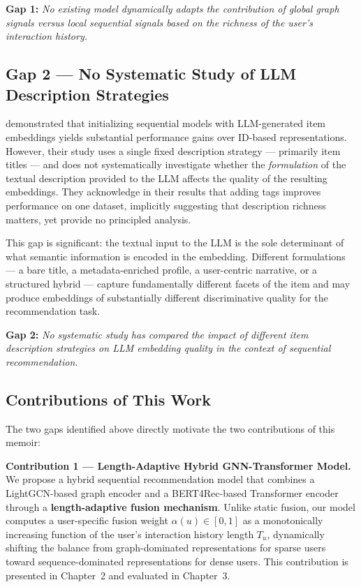 \documentclass[12pt,a4paper]{report}
\newcommand{\textcite}[1]{\citet{#1}}
\begin{document}
\noindent\textbf{Gap 1:} \textit{No existing model dynamically
adapts the contribution of global graph signals versus local
sequential signals based on the richness of the user's
interaction history.}

\subsection{Gap 2 — No Systematic Study of LLM Description Strategies}

\textcite{boz2025improving} demonstrated that initializing
sequential models with LLM-generated item embeddings yields
substantial performance gains over ID-based representations.
However, their study uses a single fixed description strategy
--- primarily item titles --- and does not systematically
investigate whether the \textit{formulation} of the textual
description provided to the LLM affects the quality of the
resulting embeddings. They acknowledge in their results that
adding tags improves performance on one dataset, implicitly
suggesting that description richness matters, yet provide
no principled analysis.

This gap is significant: the textual input to the LLM is the
sole determinant of what semantic information is encoded in
the embedding. Different formulations --- a bare title, a
metadata-enriched profile, a user-centric narrative, or a
structured hybrid --- capture fundamentally different facets
of the item and may produce embeddings of substantially
different discriminative quality for the recommendation task.

\noindent\textbf{Gap 2:} \textit{No systematic study has
compared the impact of different item description strategies
on LLM embedding quality in the context of sequential
recommendation.}

\subsection{Contributions of This Work}

The two gaps identified above directly motivate the two
contributions of this memoir:

\medskip
\noindent\textbf{Contribution 1 --- Length-Adaptive Hybrid
GNN-Transformer Model.}
We propose a hybrid sequential recommendation model that
combines a LightGCN-based graph encoder and a BERT4Rec-based
Transformer encoder through a \textbf{length-adaptive fusion
mechanism}. Unlike static fusion, our model computes a
user-specific fusion weight $\alpha(u) \in [0, 1]$ as a
monotonically increasing function of the user's interaction
history length $T_u$, dynamically shifting the balance from
graph-dominated representations for sparse users toward
sequence-dominated representations for dense users. This
contribution is presented in Chapter~2 and evaluated in
Chapter~3.
\end{document}
